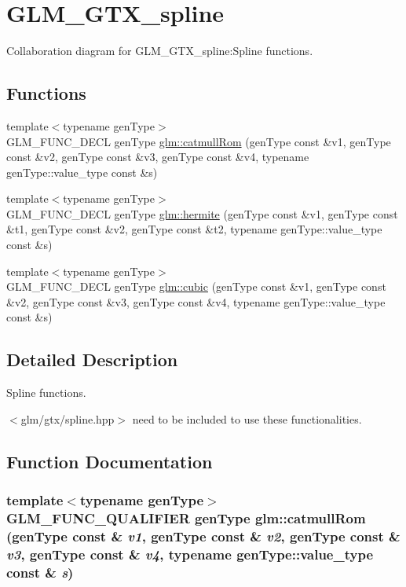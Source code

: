 \hypertarget{group__gtx__spline}{
\section{GLM\_\-GTX\_\-spline}
\label{group__gtx__spline}
}


Collaboration diagram for GLM\_\-GTX\_\-spline:Spline functions.  
\subsection*{Functions}
\begin{CompactItemize}
\item 
{\footnotesize template$<$typename genType$>$ }\\GLM\_\-FUNC\_\-DECL genType \hyperlink{group__gtx__spline_gb08e3c8b7ddaa352cd1415f654f4d628}{glm::catmullRom} (genType const \&v1, genType const \&v2, genType const \&v3, genType const \&v4, typename genType::value\_\-type const \&s)
\item 
{\footnotesize template$<$typename genType$>$ }\\GLM\_\-FUNC\_\-DECL genType \hyperlink{group__gtx__spline_ge95792c83c014a3c61b35312fb02679f}{glm::hermite} (genType const \&v1, genType const \&t1, genType const \&v2, genType const \&t2, typename genType::value\_\-type const \&s)
\item 
{\footnotesize template$<$typename genType$>$ }\\GLM\_\-FUNC\_\-DECL genType \hyperlink{group__gtx__spline_g46e54d27ad211a24813f19b80aba0329}{glm::cubic} (genType const \&v1, genType const \&v2, genType const \&v3, genType const \&v4, typename genType::value\_\-type const \&s)
\end{CompactItemize}


\subsection{Detailed Description}
Spline functions. 

$<$glm/gtx/spline.hpp$>$ need to be included to use these functionalities. 

\subsection{Function Documentation}
\hypertarget{group__gtx__spline_gb08e3c8b7ddaa352cd1415f654f4d628}{
\subsubsection[catmullRom]{\setlength{\rightskip}{0pt plus 5cm}template$<$typename genType$>$ GLM\_\-FUNC\_\-QUALIFIER genType glm::catmullRom (genType const \& {\em v1}, \/  genType const \& {\em v2}, \/  genType const \& {\em v3}, \/  genType const \& {\em v4}, \/  typename genType::value\_\-type const \& {\em s})}}
\label{group__gtx__spline_gb08e3c8b7ddaa352cd1415f654f4d628}


